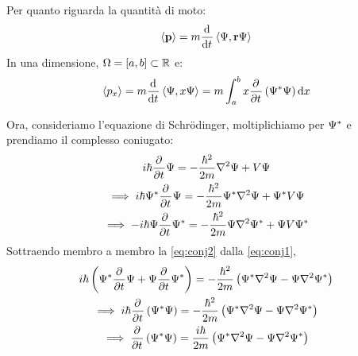 Per quanto riguarda la quantità di moto:
\begin{equation}
    \avg{\vt{p}} = m \der{t} \inner{\Psi}{\p \Psi}
\end{equation}
In una dimensione, $\Omega = [a, b] \subset \mathbb{R}$ e:
\begin{equation}
    \avg{p_x} = m \der{t} \inner{\Psi}{x \Psi}
    = m \int_a^b x \parder{t}\pts{\conj{\Psi} \Psi} \de x
\end{equation}

Ora, consideriamo l'equazione di Schrödinger, moltiplichiamo per $\Psi^*$ e prendiamo il complesso coniugato:
\begin{gather}
    \im \hbar \parder{t} \Psi = -\frac{\hbar^2}{2 m} \lapl \Psi + V \Psi \\
\label{eq:conj1}
    \implies \im \hbar \conj{\Psi} \parder{t} \Psi = -\frac{\hbar^2}{2 m} \conj{\Psi} \lapl \Psi + \conj{\Psi} V \Psi \\
\label{eq:conj2}
    \implies -\im \hbar \Psi \parder{t} \conj{\Psi} = -\frac{\hbar^2}{2 m} \Psi \lapl \conj{\Psi} + \Psi V \conj{\Psi}
\end{gather}
Sottraendo membro a membro la \eqref{eq:conj2} dalla \eqref{eq:conj1},
\begin{gather}
    \im \hbar \pts{\conj{\Psi} \parder{t} \Psi + \Psi \parder{t} \conj{\Psi}}
    = -\frac{\hbar^2}{2 m} \pts{\conj{\Psi} \lapl \Psi - \Psi \lapl \conj{\Psi}} \\
    \implies \im \hbar \parder{t} \pts{\conj{\Psi} \Psi}
    = -\frac{\hbar^2}{2 m} \pts{\conj{\Psi} \lapl \Psi - \Psi \lapl \conj{\Psi}} \\
    \implies  \parder{t} \pts{\conj{\Psi} \Psi} = \frac{\im \hbar}{2 m} \pts{\conj{\Psi} \lapl \Psi - \Psi \lapl \conj{\Psi}}
\end{gather}


